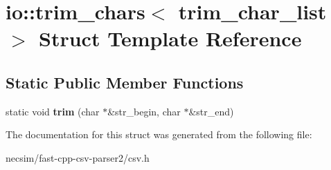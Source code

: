\hypertarget{structio_1_1trim__chars}{}\section{io\+:\+:trim\+\_\+chars$<$ trim\+\_\+char\+\_\+list $>$ Struct Template Reference}
\label{structio_1_1trim__chars}
\subsection*{Static Public Member Functions}
\begin{DoxyCompactItemize}
\item 
static void {\bfseries trim} (char $\ast$\&str\+\_\+begin, char $\ast$\&str\+\_\+end)\hypertarget{structio_1_1trim__chars_a4cffc5e839ab4024ca8c8330e26e338c}{}\label{structio_1_1trim__chars_a4cffc5e839ab4024ca8c8330e26e338c}

\end{DoxyCompactItemize}


The documentation for this struct was generated from the following file\+:\begin{DoxyCompactItemize}
\item 
necsim/fast-\/cpp-\/csv-\/parser2/csv.\+h\end{DoxyCompactItemize}
